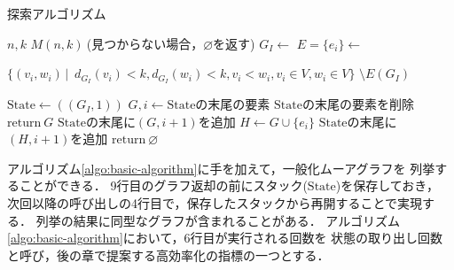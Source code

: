\begin{algorithm}
  \caption{探索アルゴリズム}
  \label{algo:basic-algorithm}
  \begin{algorithmic}[1]
    \Require $n,k$
    \Ensure $M(n,k)\:$(見つからない場合，$\varnothing$を返す)
    \State $G_I\gets$
    \State $E=\{e_i\}\gets $\parbox[t]{\linewidth}{
      $\{(v_i,w_i)\,|$
      $\,d_{G_I}(v_i)<k,d_{G_I}(w_i)<k,v_i<w_i,v_i\in V,w_i\in V\}$
      $\setminus E(G_I)$
    }
    \State $\mathrm{State}\gets((G_I,1))$
    \State $G,i\gets\mathrm{State}$の末尾の要素
    \State $\mathrm{State}$の末尾の要素を削除
    \State $\mathrm{return}\:G$
    \EndIf
    \State $\mathrm{State}$の末尾に$(G,i+1)$を追加
    \EndIf
    \State $H\gets G\cup\{e_i\}$
    \State $\mathrm{State}$の末尾に$(H,i+1)$を追加
    \EndIf
    \EndWhile
    \State $\mathrm{return}\:\varnothing$
    \EndProcedure
  \end{algorithmic}
\end{algorithm}
アルゴリズム\ref{algo:basic-algorithm}に手を加えて，一般化ムーアグラフを
列挙することができる．
9行目のグラフ返却の前にスタック($\mathrm{State}$)を保存しておき，
次回以降の呼び出しの4行目で，保存したスタックから再開することで実現する．
列挙の結果に同型なグラフが含まれることがある．
アルゴリズム\ref{algo:basic-algorithm}において，6行目が実行される回数を
状態の取り出し回数と呼び，後の章で提案する高効率化の指標の一つとする．

